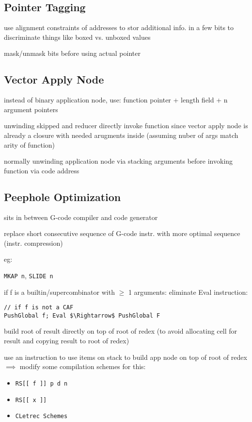 \documentclass[8pt]{extarticle}
\begin{document}
\begin{multicols*}{2}
\subsection{Pointer Tagging}
use alignment constraints of addresses to stor additional info. in a few bits to discriminate things like boxed vs. unboxed values

mask/unmask bits before using actual pointer

\subsection{Vector Apply Node}
instead of binary application node, use: function pointer + length field + n argument pointers

unwinding skipped and reducer directly invoke function since vector apply node is already a closure with needed arugments inside (assuming nuber of args match arity of function)

normally unwinding application node via stacking arguments before invoking function via code address

\subsection{Peephole Optimization}

sits in between G-code compiler and code generator

replace short consecutive sequence of G-code instr. with more optimal sequence (instr. compression)

eg:

\verb|MKAP n|, \verb|SLIDE n|

if f is a builtin/supercombinator with $\geq$ 1 arguments: eliminate Eval instruction:
\begin{lstlisting}
// if f is not a CAF
PushGlobal f; Eval $\Rightarrow$ PushGlobal F 
\end{lstlisting}

build root of result directly on top of root of redex (to avoid allocating cell for result and copying result to root of redex)

use an instruction to use items on stack to build app node on top of root of redex
$\implies$ modify some compilation schemes for this:
\begin{itemize}
\item \verb|RS[[ f ]] p d n|
\item \verb|RS[[ x ]]|
\item \verb|CLetrec Schemes|
\end{itemize}


\end{multicols*}
\end{document}
